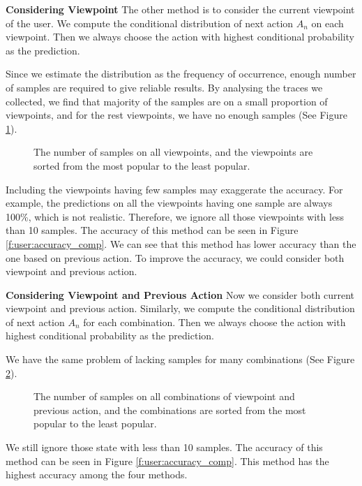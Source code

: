 \textbf{Considering Viewpoint}
The other method is to consider the current viewpoint of the user.
We compute the conditional distribution of next action $A_n$ on each viewpoint. 
Then we always choose the action with highest conditional probability as the prediction.

Since we estimate the distribution as the frequency of occurrence, enough
number of samples are required to give reliable results. 
By analysing the traces we collected, we find that majority of the samples are 
on a small proportion of viewpoints, and for the rest viewpoints, we have no enough
samples (See Figure \ref{f:user:sample_size_1}).
\begin{figure}
    \centering
    \caption{The number of samples on all viewpoints, and the viewpoints are sorted from the most popular to the least popular.}
    \label{f:user:sample_size_1}
\end{figure}
Including the viewpoints having few samples may exaggerate the accuracy.
For example, the predictions on all the viewpoints having one sample are 
always 100\%, which is not realistic.
Therefore, we ignore all those viewpoints with less than 10 samples.
The accuracy of this method can be seen in Figure \ref{f:user:accuracy_comp}.
We can see that this method has lower accuracy than the one based on previous action.
To improve the accuracy, we could consider both viewpoint and previous action.

\textbf{Considering Viewpoint and Previous Action}
Now we consider both current viewpoint and  previous action.
Similarly, we compute the conditional distribution of next action $A_n$ for each combination. 
Then we always choose the action with highest conditional probability as the prediction.

We have the same problem of lacking samples for many combinations (See Figure \ref{f:user:sample_size_2}).
\begin{figure}
    \centering
    \caption{The number of samples on all combinations of viewpoint and previous action, and the combinations are sorted from the most popular to the least popular.}
    \label{f:user:sample_size_2}
\end{figure}
We still ignore those state with  less than 10 samples.
The accuracy of this method can be seen in Figure \ref{f:user:accuracy_comp}.
This method has the highest accuracy among the four methods.

